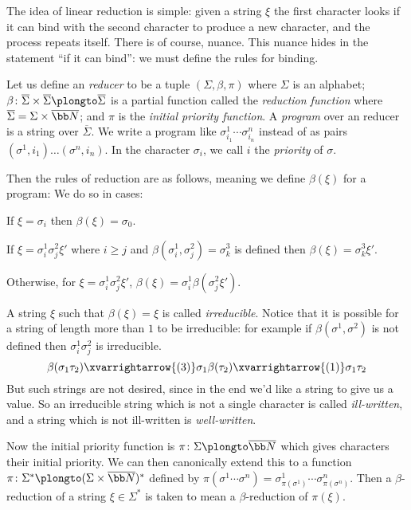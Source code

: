 The idea of linear reduction is simple: given a string $\xi$ the first character looks if it can bind with the second character to produce a new character, and the process repeats itself.
There is of course, nuance.
This nuance hides in the statement ``if it can bind'': we must define the rules for binding.

Let us define an {\it reducer} to be a tuple $(\Sigma,\beta,\pi)$ where $\Sigma$ is an alphabet; $\beta\colon\overline\Sigma\times\overline\Sigma\plongto\overline\Sigma$ is a partial function called the
{\it reduction function} where $\overline\Sigma=\Sigma\times\overline{\bb N}$; and $\pi$ is the {\it initial priority function}.
A {\it program} over an reducer is a string over $\overline\Sigma$.
We write a program like $\sigma^1_{i_1}\cdots\sigma^n_{i_n}$ instead of as pairs $(\sigma^1,i_1)\dots(\sigma^n,i_n)$.
In the character $\sigma_i$, we call $i$ the {\it priority} of $\sigma$.

Then the rules of reduction are as follows, meaning we define $\beta(\xi)$ for a program:
We do so in cases:
\benum
    \item If $\xi=\sigma_i$ then $\beta(\xi)=\sigma_0$.
    \item If $\xi=\sigma^1_i\sigma^2_j\xi'$ where $i\geq j$ and $\beta(\sigma^1_i,\sigma^2_j)=\sigma^3_k$ is defined then $\beta(\xi)=\sigma^3_k\xi'$.
    \item Otherwise, for $\xi=\sigma^1_i\sigma^2_j\xi'$, $\beta(\xi)=\sigma^1_i\beta(\sigma^2_j\xi')$.
\eenum

A string $\xi$ such that $\beta(\xi)=\xi$ is called {\it irreducible}.
Notice that it is possible for a string of length more than $1$ to be irreducible: for example if $\beta(\sigma^1,\sigma^2)$ is not defined then $\sigma^1_i\sigma^2_j$ is irreducible.
$$ \beta(\sigma_1\tau_2)\xvarrightarrow{(3)}\sigma_1\beta(\tau_2)\xvarrightarrow{(1)}\sigma_1\tau_2 $$
But such strings are not desired, since in the end we'd like a string to give us a value.
So an irreducible string which is not a single character is called {\it ill-written}, and a string which is not ill-written is {\it well-written}.

Now the initial priority function is $\pi\colon\Sigma\plongto\overline{\bb N}$ which gives characters their initial priority.
We can then canonically extend this to a function $\pi\colon\Sigma^*\plongto(\Sigma\times\overline{\bb N})^*$ defined by $\pi(\sigma^1\cdots\sigma^n)=\sigma^1_{\pi(\sigma^1)}\cdots\sigma^n_{\pi(\sigma^n)}$.
Then a $\beta$-reduction of a string $\xi\in\Sigma^*$ is taken to mean a $\beta$-reduction of $\pi(\xi)$.

